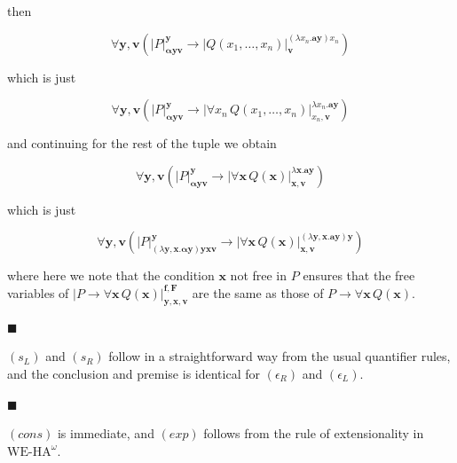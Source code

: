 \documentclass[10pt,a4paper]{article}
\begin{document}
then\par
  
\par  \quad  \[\forall\bm{y},\bm{v}\left(|{P}|^{\bm{y}}_{\bm{\alpha}\bm{y}\bm{v}}\to|{Q(x_{1},\ldots,x_{n})}|^{(\lambda x_{n}.\bm{a}\bm{y})x_{n}}_{\bm{v}}\right)\]\quad  \quad  
  
which is just\par
  
\par  \quad  \[\forall\bm{y},\bm{v}\left(|{P}|^{\bm{y}}_{\bm{\alpha}\bm{y}\bm{v}}\to|{\forall
x_{n}\,Q(x_{1},\ldots,x_{n})}|^{\lambda x_{n}.\bm{a}\bm{y}}_{x_{n},\bm{v}}\right)\]\quad  \quad  
  
and continuing for the rest of the tuple we obtain\par
  
\par  \quad  \[\forall\bm{y},\bm{v}\left(|{P}|^{\bm{y}}_{\bm{\alpha}\bm{y}\bm{v}}\to|{\forall\bm{x}\,Q(\bm{x})}|^{\lambda\bm{x}.\bm{a}\bm{y}}_{\bm{x},\bm{v}}\right)\]\quad  \quad  
  
which is just\par
  
\par  \quad  \[\forall\bm{y},\bm{v}\left(|{P}|^{\bm{y}}_{(\lambda\bm{y},\bm{x}.\bm{\alpha}\bm{y})\bm{y}\bm{x}\bm{v}}\to|{\forall\bm{x}\,Q(\bm{x})}|^{(\lambda\bm{y},\bm{x}.\bm{a}\bm{y})\bm{y}}_{\bm{x},\bm{v}}\right)\]\quad  \quad  
  
where here we note that the condition $\bm{x}$ not free in $P$ ensures that the free variables of $|{P\to\forall\bm{x}\,Q(\bm{x})}|^{\bm{f},\bm{F}}_{\bm{y},\bm{x},\bm{v}}$ are the same as those of $P\to\forall\bm{x}\,Q(\bm{x})$.\par
 
 
 
\par\noindent  $\blacksquare$ 
 
$(s_{L})$ and $(s_{R})$ follow in a straightforward way from the usual quantifier rules, and the conclusion and premise is identical for $(\epsilon_{R})$ and $(\epsilon_{L})$.\par
 
 
 
\par\noindent  $\blacksquare$ 
 
$(cons)$ is immediate, and $(exp)$ follows from the rule of extensionality in $\mathrm{WE}\mbox{-}\mathrm{HA}^{\omega}$.\par
 
\end{document}
